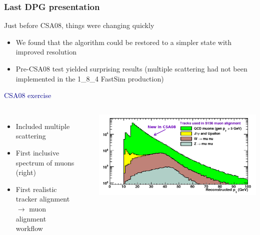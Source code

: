 \documentclass[compress]{beamer}
\begin{document}
\begin{frame}
\frametitle{Last DPG presentation}
\small

Just before CSA08, things were changing quickly
\begin{itemize}
\item We found that the algorithm could be restored to a simpler state with improved resolution
\item Pre-CSA08 test yielded surprising results (multiple scattering had not been implemented in the 1\_8\_4 FastSim production)
\end{itemize}

\vspace{0.35 cm}
\hspace{-0.83 cm} \textcolor{darkblue}{\Large CSA08 exercise}

\begin{columns}
\begin{itemize}
\item Included multiple scattering
\item First inclusive spectrum of muons (right)
\item First realistic tracker alignment $\to$ muon alignment workflow
\end{itemize}

\mbox{ }

\vspace{0.35 cm}
\includegraphics[width=\linewidth]{S156_pt_spectrum_noQCD5.png}
\end{columns}

\end{frame}
\end{document}
